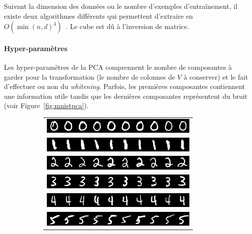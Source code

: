 Suivant la dimension des données ou le nombre d'exemples d'entraînement, il
existe deux algorithmes différents qui permettent d'extraire en
$O(\min(n,d)^3)$~\cite{bishop-book2006}.  Le cube est dû à l'inversion de
matrice.

\paragraph{Hyper-paramètres} Les hyper-paramètres de la PCA comprennent le
nombre de composantes à garder pour la transformation (le nombre de colonnes de
$V$ à conserver) et le fait d'effectuer ou non du \textit{whitening}. Parfois,
les premières composantes contiennent une information utile tandis que les
dernières composantes représentent du bruit (voir Figure~\ref{fig:mnistpca}).


\begin{figure}
\centering
\begin{subfigure}{0.45\textwidth}
\begin{tabular}{c}
  \includegraphics[width=0.9\linewidth]{predoc/images/0_ppv.png}\\
  \includegraphics[width=0.90\linewidth]{predoc/images/1_ppv.png}\\
  \includegraphics[width=0.90\linewidth]{predoc/images/2_ppv.png}\\
  \includegraphics[width=0.90\linewidth]{predoc/images/3_ppv.png}\\
  \includegraphics[width=0.90\linewidth]{predoc/images/4_ppv.png}\\
  \includegraphics[width=0.90\linewidth]{predoc/images/5_ppv.png}\\

\end{tabular}
\end{subfigure}
\end{figure}
